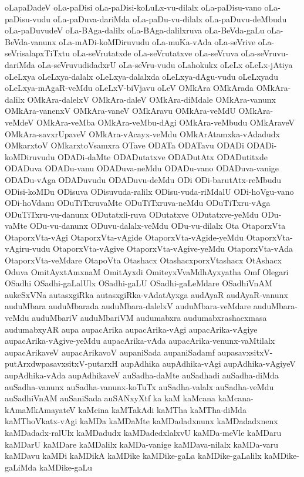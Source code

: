 {oLapaDadeV
oLa-paDisi
oLa-paDisi-koLuLx-vu-dilalx
oLa-paDisu-vano
oLa-paDisu-vudu
oLa-paDuva-dariMda
oLa-paDu-vu-dilalx
oLa-paDuvu-deMbudu
oLa-paDuvudeV
oLa-BAga-dalilx
oLa-BAga-dalilxruva
oLa-BeVda-gaLu
oLa-BeVda-vanunx
oLa-mADi-koMDiruvudu
oLa-muKa-vAda
oLa-seVrive
oLa-seVrisalapxTiTxtu
oLa-seVrutatxde
oLa-seVrutatxve
oLa-seVruva
oLa-seVruvu-dariMda
oLa-seVruvudidadxrU
oLa-seVru-vudu
oLahokukx
oLeLx
oLeLx-jAtiya
oLeLxya
oLeLxya-dalalx
oLeLxya-dalalxda
oLeLxya-dAgu-vudu
oLeLxyadu
oLeLxya-mAgaR-veMdu
oLeLxV-biVjavu
oLeV
OMkAra
OMkArada
OMkAra-dalilx
OMkAra-dalelxV
OMkAra-daleV
OMkAra-diMdale
OMkAra-vanunx
OMkAra-vanenxV
OMkAra-vaneV
OMkAravu
OMkAra-veMdU
OMkAra-veMdeV
OMkAra-veMba
OMkAra-veMbu-dAgi
OMkAra-veMbudu
OMkAraveV
OMkAra-savxrUpaveV
OMkAra-vAcayx-veMdu
OMkArAtamxka-vAdadudx
OMkarxtoV
OMkarxtoVsamxra
OTave
ODATa
ODATavu
ODADi
ODADi-koMDiruvudu
ODADi-daMte
ODADutatxve
ODADutAtx
ODADutitxde
ODADuva
ODADu-vanu
ODADuva-neMdu
ODADu-vano
ODADuva-vanige
ODADu-vAga
ODADuvudu
ODADuvu-deMdu
ODi
ODi-barutAtx-reMbudu
ODisi-koMDu
ODisuva
ODisuvuda-ralilx
ODisu-vuda-riMdalU
ODi-hoVgu-vano
ODi-hoVdanu
ODuTiTxruvaMte
ODuTiTxruva-neMdu
ODuTiTxru-vAga
ODuTiTxru-vu-danunx
ODutatxli-ruva
ODutatxve
ODutatxve-yeMdu
ODu-vaMte
ODu-vu-danunx
ODuvu-dalalx-veMdu
ODu-vu-dilalx
Ota
OtaporxVta
OtaporxVta-vAgi
OtaporxVta-vAgide
OtaporxVta-vAgide-yeMdu
OtaporxVta-vAgiru-vudu
OtaporxVta-vAgive
OtaporxVta-vAgive-yeMdu
OtaporxVta-vAda
OtaporxVta-veMdare
OtapoVta
Otashacx
OtashacxporxVtashacx
OtAshacx
Oduva
OmitAyxtAmxnaM
OmitAyxdi
OmiteyxVvaMdhAyxyatha
Omf
Olegari
OSadhi
OSadhi-gaLalUlx
OSadhi-gaLU
OSadhi-gaLeMdare
OSadhiVnAM
aukeSxVNa
autasxgiRka
autasxgiRka-vAdatAyxga
audAyaR
audAyaR-vanunx
auduMbara
auduMbarada
auduMbara-dalelxV
auduMbara-veMdare
auduMbara-veMdu
auduMbariV
auduMbariVM
audumabxra
audumabxrashacxmasa
audumabxyAR
aupa
aupacArika
aupacArika-vAgi
aupacArika-vAgiye
aupacArika-vAgive-yeMdu
aupacArika-vAda
aupacArika-venunx-vaMtilalx
aupacArikaveV
aupacArikavoV
aupaniSada
aupaniSadamf
aupasavxsitxV-putArxdwpasavxsitxV-putarxH
aupAdhika
aupAdhika-vAgi
aupAdhika-vAgiyeV
aupAdhika-vAda
aupAdhikaveV
auSadha-daMte
auSadhadi
auSadha-diMda
auSadha-vanunx
auSadha-vanunx-koTuTx
auSadha-valalx
auSadha-veMdu
auSadhiVnAM
auSaniSada
auSANxyXtf
ka
kaM
kaMcana
kaMcana-kAmaMkAmayateV
kaMcina
kaMTakAdi
kaMTha
kaMTha-diMda
kaMThoVkatx-vAgi
kaMDa
kaMDaMte
kaMDadadxnunx
kaMDadadxnenx
kaMDadadx-ralUlx
kaMDadudx
kaMDadedxlalxvU
kaMDa-meVle
kaMDaru
kaMDarU
kaMDare
kaMDalilx
kaMDa-vanige
kaMDava-nilalx
kaMDa-varu
kaMDavu
kaMDi
kaMDikA
kaMDike
kaMDike-gaLa
kaMDike-gaLalilx
kaMDike-gaLiMda
kaMDike-gaLu
}
